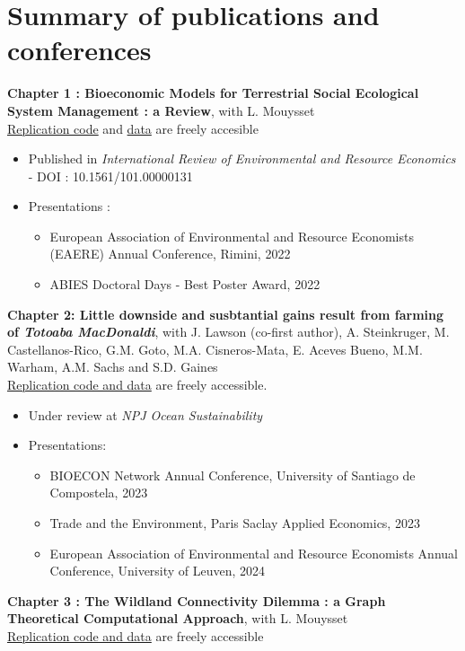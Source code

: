 \section*{Summary of publications and conferences}
\singlespacing
\textbf{Chapter 1 :  Bioeconomic Models for Terrestrial Social Ecological System Management : a Review}, with L. Mouysset\\
\href{https://github.com/sim-jean/review-irere}{Replication code} and \href{https://zenodo.org/records/6656433}{data} are freely accesible
\begin{itemize}
\item Published in \textit{International Review of Environmental and Resource Economics} - DOI : 10.1561/101.00000131
\item Presentations : 
\begin{itemize}
\item European Association of Environmental and Resource Economists (EAERE) Annual Conference, Rimini, 2022
\item ABIES Doctoral Days - Best Poster Award, 2022
\end{itemize}
\end{itemize}
%
\textbf{Chapter 2: Little downside and susbtantial gains result from farming of \textit{Totoaba MacDonaldi}}, with J. Lawson (co-first author), A. Steinkruger, M. Castellanos-Rico, G.M. Goto, M.A. Cisneros-Mata, E. Aceves Bueno, M.M. Warham, A.M. Sachs and S.D. Gaines\\
\href{https://github.com/julawson/conservation_farming_totoaba}{Replication code and data} are freely accessible.
%
\begin{itemize}
\item Under review at \textit{NPJ Ocean Sustainability}
\item Presentations:
\begin{itemize}
\item BIOECON Network Annual Conference, University of Santiago de Compostela, 2023
\item Trade and the Environment, Paris Saclay Applied Economics, 2023
\item European Association of Environmental and Resource Economists Annual Conference, University of Leuven, 2024
\end{itemize}
\end{itemize}
%
\textbf{Chapter 3 : The Wildland Connectivity Dilemma : a Graph Theoretical Computational Approach}, with L. Mouysset\\
\href{https://github.com/sim-jean/Landscape_connectivity_dilemma}{Replication code and data} are freely accessible
